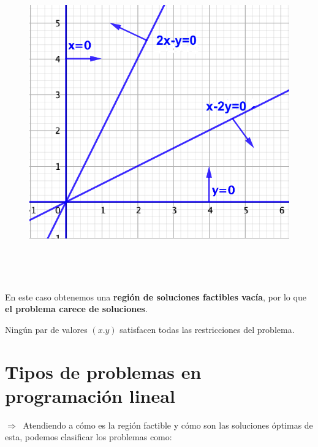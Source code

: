 \vspace{5mm}
\begin{multicols}{2}
\begin{figure}[H]
	\centering
	\includegraphics[width=.45\textwidth]{imagenes/img16.png}
\end{figure}

$\quad$  %

$\quad$  %

\begin{destacado}
En este caso obtenemos una 
\textbf{región de soluciones factibles vacía}, por lo que \textbf{el problema carece de soluciones}.

\vspace{2mm}

Ningún par de valores $(x.y)$ satisfacen todas las restricciones del problema.	
\end{destacado}
\end{multicols}
	
	
\section{Tipos de problemas en programación lineal}
	\vspace{10mm}	

$\Longrightarrow \ $ Atendiendo a cómo es la región factible y cómo son las soluciones óptimas de esta, podemos clasificar los problemas como:

